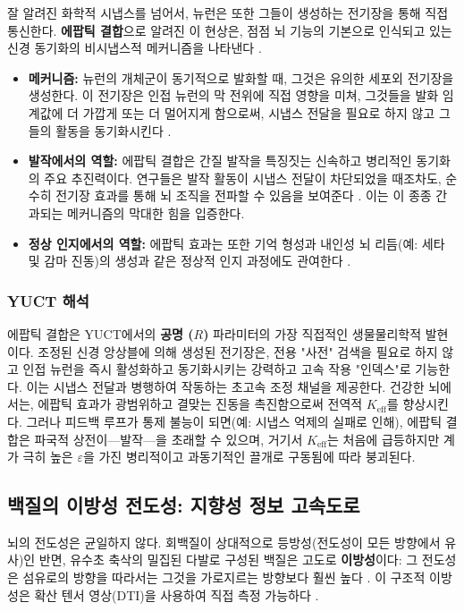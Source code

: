 \documentclass[12pt,a4paper]{article}
\begin{document}
	잘 알려진 화학적 시냅스를 넘어서, 뉴런은 또한 그들이 생성하는 전기장을 통해 직접 통신한다. \textbf{에팝틱 결합}으로 알려진 이 현상은, 점점 뇌 기능의 기본으로 인식되고 있는 신경 동기화의 비시냅스적 메커니즘을 나타낸다 \cite{Jefferys1995, Anastassiou2011}.
	
	\begin{itemize}
		\item \textbf{메커니즘:} 뉴런의 개체군이 동기적으로 발화할 때, 그것은 유의한 세포외 전기장을 생성한다. 이 전기장은 인접 뉴런의 막 전위에 직접 영향을 미쳐, 그것들을 발화 임계값에 더 가깝게 또는 더 멀어지게 함으로써, 시냅스 전달을 필요로 하지 않고 그들의 활동을 동기화시킨다 \cite{Frohlich2010}.
		\item \textbf{발작에서의 역할:} 에팝틱 결합은 간질 발작을 특징짓는 신속하고 병리적인 동기화의 주요 추진력이다. 연구들은 발작 활동이 시냅스 전달이 차단되었을 때조차도, 순수히 전기장 효과를 통해 뇌 조직을 전파할 수 있음을 보여준다 \cite{Zhang2022, Dudek1998}. 이는 이 종종 간과되는 메커니즘의 막대한 힘을 입증한다.
		\item \textbf{정상 인지에서의 역할:} 에팝틱 효과는 또한 기억 형성과 내인성 뇌 리듬(예: 세타 및 감마 진동)의 생성과 같은 정상적 인지 과정에도 관여한다 \cite{Anastassiou2011}.
	\end{itemize}
	
	\subsubsection*{YUCT 해석}
	에팝틱 결합은 YUCT에서의 \textbf{공명 (\(R\))} 파라미터의 가장 직접적인 생물물리학적 발현이다. 조정된 신경 앙상블에 의해 생성된 전기장은, 전용 "사전" 검색을 필요로 하지 않고 인접 뉴런을 즉시 활성화하고 동기화시키는 강력하고 고속 작용 "인덱스"로 기능한다. 이는 시냅스 전달과 병행하여 작동하는 초고속 조정 채널을 제공한다. 건강한 뇌에서는, 에팝틱 효과가 광범위하고 결맞는 진동을 촉진함으로써 전역적 \(K_{\mathrm{eff}}\)를 향상시킨다. 그러나 피드백 루프가 통제 불능이 되면(예: 시냅스 억제의 실패로 인해), 에팝틱 결합은 파국적 상전이—발작—을 초래할 수 있으며, 거기서 \(K_{\mathrm{eff}}\)는 처음에 급등하지만 계가 극히 높은 \(\varepsilon\)을 가진 병리적이고 과동기적인 끌개로 구동됨에 따라 붕괴된다.
	
	\subsection{백질의 이방성 전도성: 지향성 정보 고속도로}
	
	뇌의 전도성은 균일하지 않다. 회백질이 상대적으로 등방성(전도성이 모든 방향에서 유사)인 반면, 유수초 축삭의 밀집된 다발로 구성된 백질은 고도로 \textbf{이방성}이다: 그 전도성은 섬유로의 방향을 따라서는 그것을 가로지르는 방향보다 훨씬 높다 \cite{Tuch2001}. 이 구조적 이방성은 확산 텐서 영상(DTI)을 사용하여 직접 측정 가능하다 \cite{Wu2018}.
	
\end{document}
